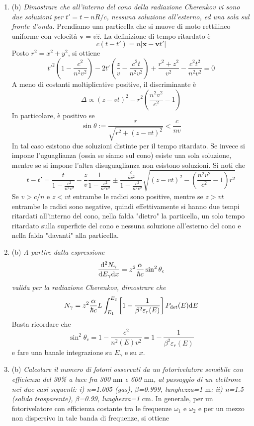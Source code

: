 \documentclass{article}
\renewcommand{\b}{(b)}
\renewcommand{\t}[1]{\textit{ #1}}
\renewcommand{\vec}[1]{\mathbf{#1}}
\begin{document}
\begin{enumerate}
	\item\b\t{Dimostrare che all’interno del cono della radiazione Cherenkov vi sono due
		soluzioni per $t' = t - nR/c$, nessuna soluzione all’esterno, ed una sola sul fronte
		d’onda.} Prendiamo una particella che si muove di moto rettilineo uniforme con velocità $\vec{v}=v\hat{z}$. La definizione di tempo ritardato è
	\[c(t-t')=n|\vec{x}-\vec{v}t'|\]
	Posto $r^2=x^2+y^2$, si ottiene
	\[t'^2\left(1-\frac{c^2}{n^2v^2}\right)-2t'\left(\frac{z}{v}-\frac{c^2t}{n^2v^2}\right)+\frac{r^2+z^2}{v^2}-\frac{c^2t^2}{n^2v^2}=0\]
	A meno di costanti moltiplicative positive, il discriminante è
	\[\Delta\propto(z-vt)^2-r^2\left(\frac{n^2v^2}{c^2}-1\right)\]
	In particolare, è positivo se
	\[\sin\theta:=\frac{r}{\sqrt{r^2+(z-vt)^2}}<\frac{c}{nv}\]
	In tal caso esistono due soluzioni distinte per il tempo ritardato. Se invece si impone l'uguaglianza (ossia se siamo sul cono) esiste una sola soluzione, mentre se si impone l'altra disuguaglianza non esistono soluzioni. Si noti che
	\[t-t'=\frac{t}{1-\frac{c^2}{n^2v^2}}-\frac{z}{v}\frac{1}{1-\frac{c^2}{n^2v^2}}\pm\frac{\frac{c}{nv^2}}{1-\frac{c^2}{n^2v^2}}\sqrt{(z-vt)^2-\left(\frac{n^2v^2}{c^2}-1\right)r^2}\]
	Se $v>c/n$ e $z<vt$ entrambe le radici sono positive, mentre se $z>vt$ entrambe le radici sono negative, quindi effettivamente si hanno due tempi ritardati all'interno del cono, nella falda "dietro" la particella, un solo tempo ritardato sulla superficie del cono e nessuna soluzione all'esterno del cono e nella falda "davanti" alla particella.
	\item\b\t{A partire dalla espressione 
		\[\frac{\mathrm{d} ^2N_\gamma}{\mathrm{d} E_\gamma \mathrm{d} x}=z^2\frac{\alpha}{\hbar c}\sin^2\theta_c\] valida per la radiazione Cherenkov,		dimostrare che \[N_\gamma=z^2\frac{\alpha
		}{\hbar c}L\int_{E_1}^{E_2}\left[1-\frac{1}{\beta^2\varepsilon_r(E)}\right]P_\mathrm{det}(E)\mathrm{d} E\]}
		Basta ricordare che
		\[\sin^2\theta_c=1-\frac{c^2}{n^2(E)v^2}=1-\frac{1}{\beta^2\varepsilon_r(E)}\]
		e fare una banale integrazione su $E_\gamma$ e su $x$.
	\item\b\t{Calcolare il numero di fotoni osservati da un fotorivelatore sensibile con
		efficienza del 30\% a luce fra 300 $\mathrm{nm}$ e 600 $\mathrm{nm}$, al passaggio di un elettrone nei due
		casi seguenti: i) n=1.005 (gas), $\beta$=0.999, lunghezza=1 $\mathrm{m}$; ii) n=1.5 (solido
		trasparente), $\beta$=0.99, lunghezza=1 $\mathrm{cm}$.}
	In generale, per un fotorivelatore con efficienza costante tra le frequenze $\omega_1$ e $\omega_2$ e per un mezzo non dispersivo in tale banda di frequenze, si ottiene

\end{enumerate}
\end{document}
